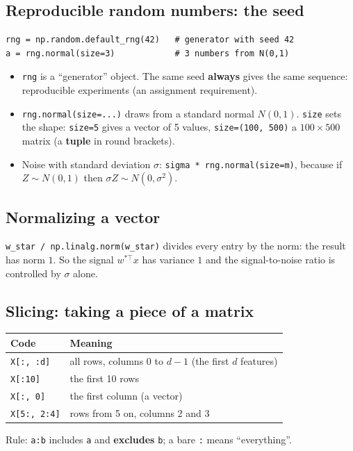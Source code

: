 \documentclass[11pt,a4paper]{article}
\begin{document}
\subsection{Reproducible random numbers: the seed}
\begin{lstlisting}
rng = np.random.default_rng(42)   # generator with seed 42
a = rng.normal(size=3)            # 3 numbers from N(0,1)
\end{lstlisting}
\begin{itemize}
  \item \texttt{rng} is a ``generator'' object. The same seed \textbf{always} gives the same sequence: reproducible experiments
        (an assignment requirement).
  \item \texttt{rng.normal(size=...)} draws from a standard normal $N(0,1)$. \texttt{size} sets the shape:
        \texttt{size=5} gives a vector of 5 values, \texttt{size=(100, 500)} a $100\times 500$ matrix (a \textbf{tuple} in round brackets).
  \item Noise with standard deviation $\sigma$: \texttt{sigma * rng.normal(size=m)}, because if $Z\sim N(0,1)$ then $\sigma Z \sim N(0,\sigma^2)$.
\end{itemize}

\subsection{Normalizing a vector}
\texttt{w\_star / np.linalg.norm(w\_star)} divides every entry by the norm: the result has norm $1$.
So the signal $w^{*\top}x$ has variance $1$ and the signal-to-noise ratio is controlled by $\sigma$ alone.

\subsection{Slicing: taking a piece of a matrix}
\begin{center}
\begin{tabular}{@{}ll@{}}
\toprule
Code & Meaning \\
\midrule
\texttt{X[:, :d]} & all rows, columns $0$ to $d-1$ (the first $d$ features) \\
\texttt{X[:10]} & the first 10 rows \\
\texttt{X[:, 0]} & the first column (a vector) \\
\texttt{X[5:, 2:4]} & rows from 5 on, columns 2 and 3 \\
\bottomrule
\end{tabular}
\end{center}
Rule: \texttt{a:b} includes \texttt{a} and \textbf{excludes} \texttt{b}; a bare \texttt{:} means ``everything''.
\end{document}
